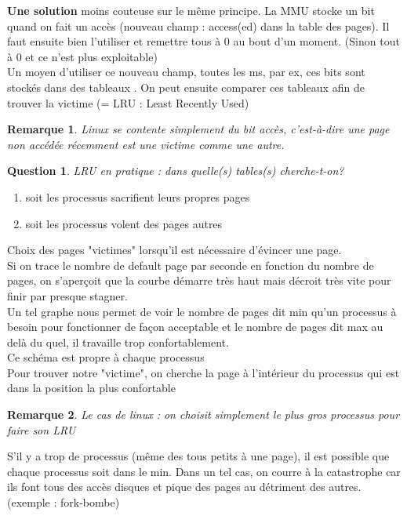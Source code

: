 \documentclass[12pt,a4paper]{report}
\newtheorem*{rem}{Remarque}
\newtheorem*{q}{Question}
\begin{document}
\textbf{Une solution} moins couteuse sur le même principe. La MMU stocke un bit quand on fait un accès (nouveau champ : access(ed) dans la table des pages). Il faut ensuite bien l'utiliser et remettre tous à 0 au bout d'un moment. (Sinon tout à 0 et ce n'est plus exploitable)\\
Un moyen d'utiliser ce nouveau champ, toutes les ms, par ex, ces bits sont stockés dans des tableaux .
On peut ensuite comparer ces tableaux afin de trouver la victime (= LRU : Least Recently Used)\\

\begin{rem}Linux se contente simplement du bit accès, c'est-à-dire une page non accédée récemment est une victime comme une autre.\end{rem}

\begin{q}LRU en pratique : dans quelle(s) tables(s) cherche-t-on?\end{q}
\begin{enumerate}
\item soit les processus sacrifient leurs propres pages
\item soit les processus volent des pages autres
\end{enumerate}


Choix des pages "victimes" lorsqu'il est nécessaire d'évincer une page.\\
Si on trace le nombre de default page par seconde en fonction du nombre de pages, on s'aperçoit que la courbe démarre très haut mais décroit très vite pour finir par presque stagner.\\
Un tel graphe nous permet de voir le nombre de pages dit min qu'un processus à besoin pour fonctionner de façon acceptable et le nombre de pages dit max au delà du quel, il travaille trop confortablement.\\
Ce schéma est propre à chaque processus\\
Pour trouver notre "victime", on cherche la page à l'intérieur du processus qui est dans la position la plus confortable\\ 
\begin{rem}
Le cas de linux : on choisit simplement le plus gros processus pour faire son LRU \end{rem}

S'il y a trop de processus (même des tous petits à une page), il est possible que chaque processus soit dans le min. Dans un tel cas, on courre à la catastrophe car ils font tous des accès disques et pique des pages au détriment des autres. (exemple : fork-bombe)\\
\end{document}
